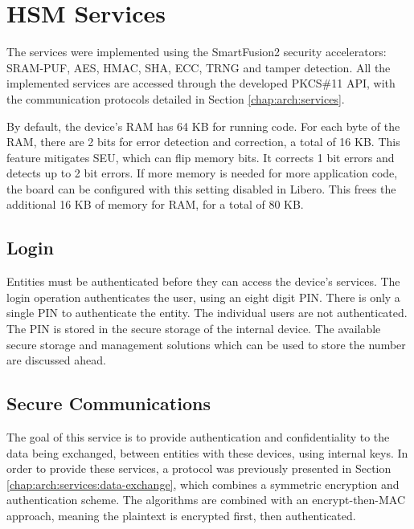 \section{HSM Services}\label{chap:implementation:services}

The services were implemented using the SmartFusion2 security accelerators: SRAM-PUF, AES, HMAC, SHA, ECC, TRNG and tamper detection.
All the implemented services are accessed through the developed PKCS\#11 API, with the communication protocols detailed in Section \ref{chap:arch:services}.

By default, the device's \ac{RAM} has 64 KB for running code. For each byte of the RAM, there are 2 bits for error detection and correction, a total of 16 KB. This feature mitigates \ac{SEU}, which can flip memory bits. It corrects 1 bit errors and detects up to 2 bit errors. If more memory is needed for more application code, the board can be configured with this setting disabled in Libero. This frees the additional 16 KB of memory for RAM, for a total of 80 KB.

\subsection{Login}\label{chap:implementation:services:authentication}

Entities must be authenticated before they can access the device's services. The login operation authenticates the user, using an eight digit PIN.
There is only a single PIN to authenticate the entity. The individual users are not authenticated.
The PIN is stored in the secure storage of the internal device. The available secure storage and management solutions which can be used to store the number are discussed ahead.

\subsection{Secure Communications}\label{chap:implementation:services:secure}

The goal of this service is to provide authentication and confidentiality to the data being exchanged, between entities with these devices, using internal keys.
In order to provide these services, a protocol was previously presented in Section \ref{chap:arch:services:data-exchange}, which combines a symmetric encryption and authentication scheme. The algorithms are combined with an encrypt-then-MAC approach, meaning the plaintext is encrypted first, then authenticated.

